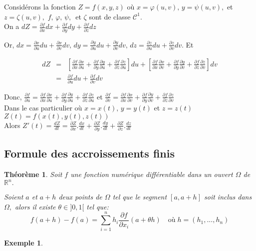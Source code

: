 \documentclass[11pt,a4paper]{report}
\newtheorem{theorem}{Théorème}[section]
\newtheorem{ex}{Exemple}[section]
\begin{document}
Considérons la fonction $Z=f(x,y,z)$ où $x=\varphi(u,v),\,y=\psi(u,v),$ et $z=\zeta(u,v),$ $f,\,\varphi,\,\psi,\,$ et $\zeta$ sont de classe $\mathcal{C}^1.$\\

On a $dZ=\frac{\partial f}{\partial x} dx+\frac{\partial f}{\partial y} dy+\frac{\partial f}{\partial z} dz$

Or, $dx=\frac{\partial x}{\partial u}du+\frac{\partial x}{\partial v}dv,\,dy=\frac{\partial y}{\partial u}du+\frac{\partial y}{\partial v}dv,\,dz=\frac{\partial z}{\partial u}du+\frac{\partial z}{\partial v}dv.$ Et

\begin{eqnarray*}
dZ
&=& [\frac{\partial f}{\partial x}\frac{\partial x}{\partial u}+\frac{\partial f}{\partial y}\frac{\partial y}{\partial u}+\frac{\partial f}{\partial z}\frac{\partial z}{\partial u}]du+[\frac{\partial f}{\partial x}\frac{\partial x}{\partial v}+\frac{\partial f}{\partial y}\frac{\partial y}{\partial v}+\frac{\partial f}{\partial z}\frac{\partial z}{\partial v}]dv\\
&=&\frac{\partial f}{\partial u}du+\frac{\partial f}{\partial v}dv
\end{eqnarray*}

Donc, $\frac{\partial f}{\partial u}=\frac{\partial f}{\partial x}\frac{\partial x}{\partial u}+\frac{\partial f}{\partial y}\frac{\partial y}{\partial u}+\frac{\partial f}{\partial z}\frac{\partial z}{\partial u}$ et
$\frac{\partial f}{\partial v}=\frac{\partial f}{\partial x}\frac{\partial x}{\partial v}+\frac{\partial f}{\partial y}\frac{\partial y}{\partial v}+\frac{\partial f}{\partial z}\frac{\partial z}{\partial v}$\\


Dans le cas particulier où $x=x(t),\,y=y(t)$ et $z=z(t)$\\
$Z(t)=f(x(t),y(t),z(t))$\\

Alors $Z'(t)=\frac{dZ}{dt}=\frac{\partial Z}{\partial x}.\frac{dx}{dt}+\frac{\partial Z}{\partial y}.\frac{dy}{dt}+\frac{\partial Z}{\partial z}.\frac{dz}{dt}$

\subsection{Formule des accroissements finis}
\begin{theorem}
Soit $f$ une fonction numérique différentiable dans un ouvert $\Omega$ de $\mathbb{R}^n.$

Soient $a$ et $a+h$ deux points de $\Omega$ tel que le segment $[a,a+h]$ soit inclus dans $\Omega,$ alors il existe $\theta\in ]0,1[$ tel que:
$$f(a+h)-f(a)=\sum_{i=1}^{n}h_i \frac{\partial f}{\partial x_i}(a+\theta h)\quad\mbox{où}\;h=(h_1,...,h_n) $$
\end{theorem}
\begin{ex}
\end{ex}
\end{document}
